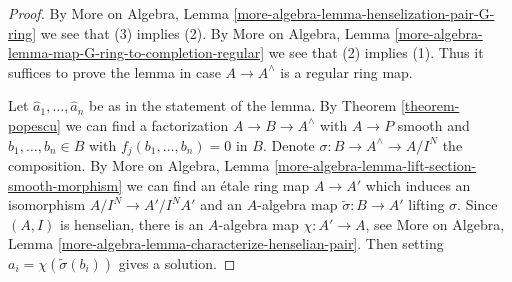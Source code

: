 \begin{proof}
By More on Algebra, Lemma
\ref{more-algebra-lemma-henselization-pair-G-ring}
we see that (3) implies (2). By More on Algebra, Lemma
\ref{more-algebra-lemma-map-G-ring-to-completion-regular}
we see that (2) implies (1).
Thus it suffices to prove the lemma in case $A \to A^\wedge$ is
a regular ring map.

\medskip\noindent
Let $\hat{a}_1, \ldots, \hat{a}_n$ be as in the statement of the lemma.
By Theorem \ref{theorem-popescu} we can find a factorization
$A \to B \to A^\wedge$ with $A \to P$ smooth and
$b_1, \ldots, b_n \in B$ with $f_j(b_1, \ldots, b_n) = 0$ in $B$.
Denote $\sigma : B \to A^\wedge \to A/I^N$ the composition.
By More on Algebra, Lemma \ref{more-algebra-lemma-lift-section-smooth-morphism}
we can find an \'etale ring
map $A \to A'$ which induces an isomorphism $A/I^N \to A'/I^NA'$
and an $A$-algebra map $\tilde \sigma : B \to A'$ lifting $\sigma$.
Since $(A, I)$ is henselian, there is an $A$-algebra map $\chi : A' \to A$,
see More on Algebra, Lemma \ref{more-algebra-lemma-characterize-henselian-pair}.
Then setting $a_i = \chi(\tilde \sigma(b_i))$ gives a solution.
\end{proof}









